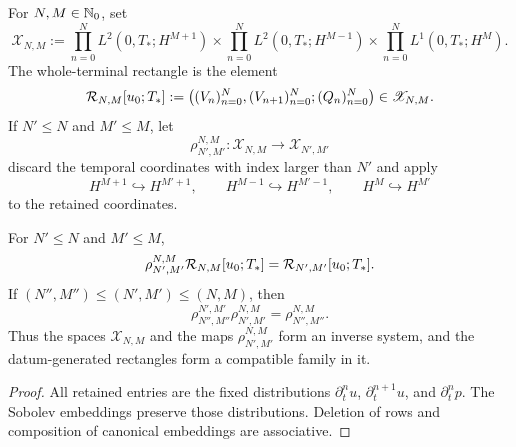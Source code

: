 \begin{definition}
\label{def:finite-window-space}
For \(N,M\in\mathbb N_0\), set
\[
 \mathscr X_{N,M}:=
 \prod_{n=0}^{N}L^2(0,T_*;H^{M+1})
 \times
 \prod_{n=0}^{N}L^2(0,T_*;H^{M-1})
 \times
 \prod_{n=0}^{N}L^1(0,T_*;H^M).
\]
The whole-terminal rectangle is the element
\begin{equation}
 \mathcal R_{N,M}[u_0;T_*]
 :=\left(
 (V_n)_{n=0}^{N},
 (V_{n+1})_{n=0}^{N};
 (Q_n)_{n=0}^{N}
 \right)\in\mathscr X_{N,M}.
 \label{eq:whole-terminal-rectangle-element}
\end{equation}
If \(N'\le N\) and \(M'\le M\), let
\[
 \rho_{N',M'}^{N,M}:\mathscr X_{N,M}\longrightarrow\mathscr X_{N',M'}
\]
discard the temporal coordinates with index larger than \(N'\) and apply
\[
 H^{M+1}\hookrightarrow H^{M'+1},
 \qquad H^{M-1}\hookrightarrow H^{M'-1},
 \qquad H^M\hookrightarrow H^{M'}
\]
to the retained coordinates.
\end{definition}

\begin{proposition}
\label{prop:rectangle-compatibility}
For \(N'\le N\) and \(M'\le M\),
\begin{equation}
 \rho_{N',M'}^{N,M}\mathcal R_{N,M}[u_0;T_*]
 =\mathcal R_{N',M'}[u_0;T_*].
 \label{eq:rectangle-compatibility}
\end{equation}
If
\((N'',M'')\le(N',M')\le(N,M)\), then
\[
 \rho_{N'',M''}^{N',M'}\rho_{N',M'}^{N,M}
 =\rho_{N'',M''}^{N,M}.
\]
Thus the spaces \(\mathscr X_{N,M}\) and the maps
\(\rho_{N',M'}^{N,M}\) form an inverse system, and the datum-generated
rectangles form a compatible family in it.
\end{proposition}

\begin{proof}
All retained entries are the fixed distributions
\(\partial_t^nu\), \(\partial_t^{n+1}u\), and \(\partial_t^np\).
The Sobolev embeddings preserve those distributions.  Deletion of rows and
composition of canonical embeddings are associative.
\end{proof}
